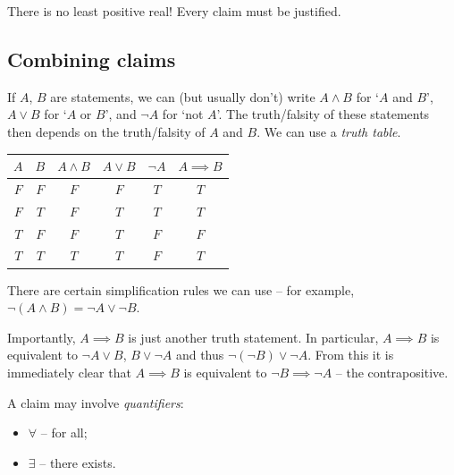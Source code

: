 \documentclass{../../template/note}
\begin{document}
    \begin{remark*}
        There is no least positive real! Every claim must be justified.
    \end{remark*}
    
    \subsection{Combining claims}
    
    If \(A\), \(B\) are statements, we can (but usually don't) write \(A \wedge B\) for `\(A\) and \(B\)', \(A \vee B\) for `\(A\) or \(B\)', and \(\neg A\) for `not \(A\)'. The truth/falsity of these statements then depends on the truth/falsity of \(A\) and \(B\). We can use a \emph{truth table}.

    \begin{center}
    
        \begin{tabular}{c | c | c | c | c | c}
            \(A\) & \(B\) & \(A \wedge B\) & \(A \vee B\) & \(\neg A\) & \(A \implies B\) \\
            \hline
            \(F\) & \(F\) & \(F\) & \(F\) & \(T\) & \(T\) \\
            \(F\) & \(T\) & \(F\) & \(T\) & \(T\) & \(T\) \\
            \(T\) & \(F\) & \(F\) & \(T\) & \(F\) & \(F\) \\
            \(T\) & \(T\) & \(T\) & \(T\) & \(F\) & \(T\) \\
        \end{tabular}
        
    \end{center}

    There are certain simplification rules we can use -- for example, \(\neg (A \wedge B) = \neg A \vee \neg B\).

    Importantly, \(A \implies B\) is just another truth statement. In particular, \(A \implies B\) is equivalent to \(\neg A \vee B\), \(B \vee \neg A\) and thus \(\neg(\neg B) \vee \neg A\). From this it is immediately clear that \(A \implies B\) is equivalent to \(\neg B \implies \neg A\) -- the contrapositive.
    
    A claim may involve \emph{quantifiers}:

    \begin{itemize}
        \item \(\forall\) -- for all;
        \item \(\exists\) -- there exists.
    \end{itemize}
    
\end{document}
